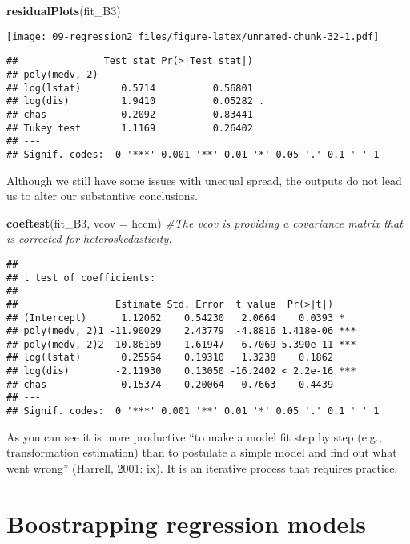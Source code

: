 \documentclass[
]{book}
\newenvironment{Shaded}{\begin{snugshade}}{\end{snugshade}}
\newcommand{\AttributeTok}[1]{\textcolor[rgb]{0.13,0.29,0.53}{#1}}
\newcommand{\CommentTok}[1]{\textcolor[rgb]{0.56,0.35,0.01}{\textit{#1}}}
\newcommand{\FunctionTok}[1]{\textcolor[rgb]{0.13,0.29,0.53}{\textbf{#1}}}
\newcommand{\NormalTok}[1]{#1}
\begin{document}
\begin{Shaded}
\begin{Highlighting}[]
\FunctionTok{residualPlots}\NormalTok{(fit\_B3)}
\end{Highlighting}
\end{Shaded}

\texttt{[image: 09-regression2\_files/figure-latex/unnamed-chunk-32-1.pdf]}

\begin{verbatim}
##               Test stat Pr(>|Test stat|)  
## poly(medv, 2)                             
## log(lstat)       0.5714          0.56801  
## log(dis)         1.9410          0.05282 .
## chas             0.2092          0.83441  
## Tukey test       1.1169          0.26402  
## ---
## Signif. codes:  0 '***' 0.001 '**' 0.01 '*' 0.05 '.' 0.1 ' ' 1
\end{verbatim}

Although we still have some issues with unequal spread, the outputs do not lead us to alter our substantive conclusions.

\begin{Shaded}
\begin{Highlighting}[]
\FunctionTok{coeftest}\NormalTok{(fit\_B3, }\AttributeTok{vcov =}\NormalTok{ hccm) }\CommentTok{\#The vcov is providing a covariance matrix that is corrected for heteroskedasticity.}
\end{Highlighting}
\end{Shaded}

\begin{verbatim}
## 
## t test of coefficients:
## 
##                 Estimate Std. Error  t value  Pr(>|t|)    
## (Intercept)      1.12062    0.54230   2.0664    0.0393 *  
## poly(medv, 2)1 -11.90029    2.43779  -4.8816 1.418e-06 ***
## poly(medv, 2)2  10.86169    1.61947   6.7069 5.390e-11 ***
## log(lstat)       0.25564    0.19310   1.3238    0.1862    
## log(dis)        -2.11930    0.13050 -16.2402 < 2.2e-16 ***
## chas             0.15374    0.20064   0.7663    0.4439    
## ---
## Signif. codes:  0 '***' 0.001 '**' 0.01 '*' 0.05 '.' 0.1 ' ' 1
\end{verbatim}

As you can see it is more productive ``to make a model fit step by step (e.g., transformation estimation) than to postulate a simple model and find out what went wrong'' (Harrell, 2001: ix). It is an iterative process that requires practice.

\section{Boostrapping regression models}\label{boostrapping-regression-models}
\end{document}
